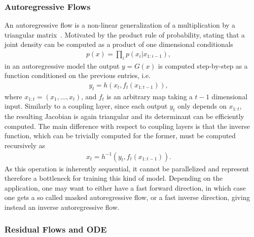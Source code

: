 \subsubsection{Autoregressive Flows}

An autoregressive flow is a non-linear generalization of a multiplication by a triangular matrix~\cite{kingma2017improving, papamakarios2018masked}. 
Motivated by the product rule of probability, stating that a joint density can be computed as a product of one dimensional conditionals
%
\begin{align}
p(x) = \prod_i p (x_i | x_{1:i-1}),
\end{align}
%
in an autoregressive model the output $y = G(x)$ is computed step-by-step as a function conditioned on the previous entries, i.e.\   
%
\begin{align}
y_t = h(x_t, f_t(x_{1:t-1})),
\end{align}
%
where $x_{1:t} = (x_1, \ldots, x_t)$, and $f_t$ is an arbitrary map taking a $t-1$ dimensional input. 
Similarly to a coupling layer, since each output $y_t$ only depends on $x_{1:t}$, the resulting Jacobian is again triangular and its determinant can be efficiently computed. The main difference with respect to coupling layers is that the inverse function, which can be trivially computed for the former, must be computed recursively as
%
\begin{align}
x_t = h^{-1}(y_t, f_t(x_{1:t-1})).
\end{align}
%
As this operation is inherently sequential, it cannot be parallelized and represent therefore a bottleneck for training this kind of model. Depending on the application, one may want to either have a fast forward direction, in which case one gets a so called masked autoregressive flow, or a fast inverse direction, giving instead an inverse autoregressive flow.

\subsubsection{Residual Flows and ODE}

